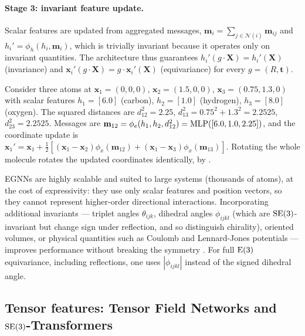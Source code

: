 \paragraph{Stage 3: invariant feature update.}
Scalar features are updated from aggregated messages, $\mathbf{m}_i = \sum_{j \in
\mathcal{N}(i)} \mathbf{m}_{ij}$ and $h_i' = \phi_h(h_i, \mathbf{m}_i)$, which is
trivially invariant because it operates only on invariant quantities. The
architecture thus guarantees $h_i'(g \cdot \mathbf{X}) = h_i'(\mathbf{X})$
(invariance) and $\mathbf{x}_i'(g \cdot \mathbf{X}) = g \cdot
\mathbf{x}_i'(\mathbf{X})$ (equivariance) for every $g = (R, \mathbf{t})$.

\begin{example}
\label{ex:groups:egnn-molecular}
Consider three atoms at $\mathbf{x}_1 = (0,0,0)$, $\mathbf{x}_2 = (1.5,0,0)$,
$\mathbf{x}_3 = (0.75, 1.3, 0)$ with scalar features $h_1 = [6.0]$ (carbon),
$h_2 = [1.0]$ (hydrogen), $h_3 = [8.0]$ (oxygen). The squared distances are
$d_{12}^2 = 2.25$, $d_{13}^2 = 0.75^2 + 1.3^2 = 2.2525$, $d_{23}^2 = 2.2525$.
Messages are $\mathbf{m}_{12} = \phi_e(h_1, h_2, d_{12}^2) = \operatorname{MLP}([6.0, 1.0,
2.25])$, and the coordinate update is $\mathbf{x}_1' = \mathbf{x}_1 +
\tfrac{1}{2}[(\mathbf{x}_1 - \mathbf{x}_2)\phi_x(\mathbf{m}_{12}) + (\mathbf{x}_1
- \mathbf{x}_3)\phi_x(\mathbf{m}_{13})]$. Rotating the whole molecule rotates the
updated coordinates identically, by .
\end{example}

EGNNs are highly scalable and suited to large systems (thousands of atoms), at
the cost of expressivity: they use only scalar features and position vectors, so
they cannot represent higher-order directional interactions. Incorporating
additional invariants --- triplet angles $\theta_{ijk}$, dihedral angles
$\phi_{ijkl}$ (which are $\operatorname{SE}(3)$-invariant but change sign under reflection, and
so distinguish chirality), oriented volumes, or physical quantities such as
Coulomb and Lennard-Jones potentials --- improves performance without breaking
the symmetry \citep{tholke2022geometric}. For full $\operatorname{E}(3)$ equivariance,
including reflections, one uses $|\phi_{ijkl}|$ instead of the signed dihedral
angle.

\subsection{Tensor features: Tensor Field Networks and $\operatorname{SE}(3)$-Transformers}
\label{sec:groups:tfn}

